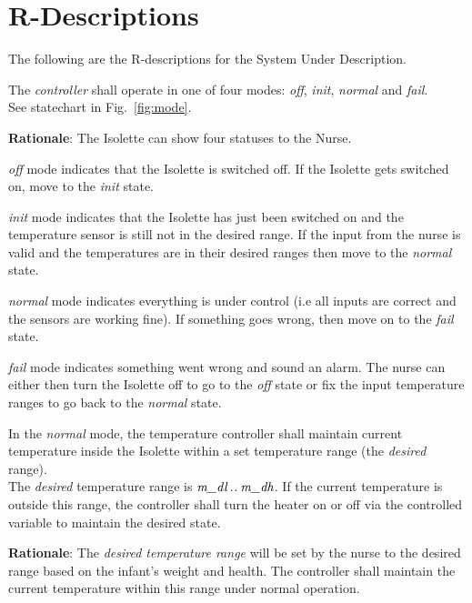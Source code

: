 \documentclass[fontsize=12pt,paper=letter,twoside]{scrartcl}
\begin{document}
%

\newpage
\section{R-Descriptions}

The following are the R-descriptions for the System Under Description.

\rdescription
{The \emph{controller} shall operate in one of four modes: \emph{off}, \emph{init}, \emph{normal} and \emph{fail}.\\}
{See statechart in Fig.~\ref{fig:mode}.}
\label{R1}

\smallskip
\noindent \textbf{Rationale}: The Isolette can show four statuses to the Nurse.
\begin{mylist}
\item \emph{off} mode indicates that the Isolette is switched off. If the Isolette gets switched on, move to the \emph{init} state.
\item \emph{init} mode indicates that the Isolette has just been switched on and the temperature sensor is still not in the desired range. If the input from the nurse is valid and the temperatures are in their desired ranges then move to the \emph{normal} state.
\item \emph{normal} mode indicates everything is under control (i.e all inputs are correct and the sensors are working fine). If something goes wrong, then move on to the \emph{fail} state.
\item \emph{fail} mode indicates something went wrong and sound an alarm. The nurse can either then turn the Isolette off to go to the \emph{off} state or fix the input temperature ranges to go back to the \emph{normal} state.
\end{mylist} 

\rdescription
{In the \emph{normal} mode, the temperature controller shall maintain current temperature inside the Isolette within a set temperature range (the \emph{desired} range).\\}
{The \emph{desired} temperature range is $\textit{m\_dl} \mathbin{.\mkern1mu.} \textit{m\_dh}$. If the current temperature  is outside this range, the controller shall turn the heater on or off via the controlled variable  to maintain the desired state.\smallskip}
\label{R2}

\smallskip
\noindent \textbf{Rationale}: The \emph{desired temperature range} will be set by the nurse to the desired range based on the infant's weight and health. The controller shall maintain the current temperature within this range under normal operation.
\end{document}
